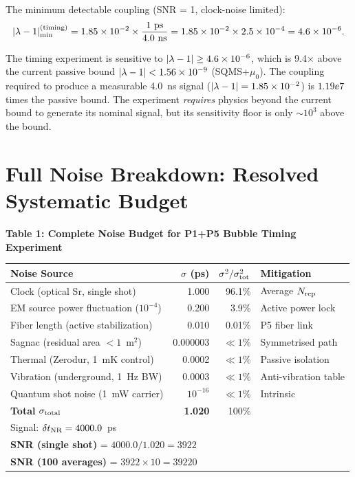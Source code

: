The minimum detectable coupling (SNR = 1, clock-noise limited):
\begin{equation}
|\lambda - 1|_{\rm min}^{(\rm timing)} = 1.85\times 10^{-2} \times \frac{1~\text{ps}}{4.0~\text{ns}}
= 1.85\times 10^{-2} \times 2.5\times 10^{-4} = 4.6\times 10^{-6}.
\label{eq:lambda_min_timing}
\end{equation}

\begin{corollary}
The timing experiment is sensitive to $|\lambda - 1| \geq 4.6\times 10^{-6}$,
which is 9.4$\times$ above the current passive bound
$|\lambda - 1| < 1.56\times 10^{-9}$ (SQMS+$\mu_0$). The coupling required to
produce a measurable 4.0~ns signal ($|\lambda - 1| = 1.85\times 10^{-2}$) is
$1.19\ee{7}$ times the passive bound. The experiment \emph{requires}
physics beyond the current bound to generate its nominal signal, but
its sensitivity floor is only $\sim10^3$ above the bound.
\end{corollary}

\section{Full Noise Breakdown: Resolved Systematic Budget}
\label{sec:systematics}

\begin{center}
\textbf{Table 1: Complete Noise Budget for P1+P5 Bubble Timing Experiment}
\vspace{0.5em}

\begin{tabular}{@{}lrrl@{}}
\toprule
\textbf{Noise Source} & $\sigma$ (ps) & $\sigma^2/\sigma_{\rm tot}^2$ & \textbf{Mitigation} \\
\midrule
Clock (optical Sr, single shot)     & 1.000 & 96.1\%  & Average $N_{\rm rep}$ \\
EM source power fluctuation ($10^{-4}$) & 0.200 & 3.9\%  & Active power lock \\
Fiber length (active stabilization) & 0.010 & 0.01\%  & P5 fiber link \\
Sagnac (residual area $< 1$~m$^2$) & 0.000003 & $\ll 1\%$ & Symmetrised path \\
Thermal (Zerodur, 1~mK control)     & 0.0002 & $\ll 1\%$ & Passive isolation \\
Vibration (underground, 1~Hz BW)    & 0.0003 & $\ll 1\%$ & Anti-vibration table \\
Quantum shot noise (1~mW carrier)   & $10^{-16}$ & $\ll 1\%$ & Intrinsic \\
\midrule
\textbf{Total} $\sigma_{\rm total}$ & \textbf{1.020} & 100\% & \\
\midrule
\multicolumn{4}{l}{Signal: $\delta t_{\rm NR} = 4000.0$~ps}\\
\multicolumn{4}{l}{\textbf{SNR (single shot)} = $4000.0/1.020 = 3922$}\\
\multicolumn{4}{l}{\textbf{SNR (100 averages)} = $3922\times10 = 39220$}\\
\bottomrule
\end{tabular}
\end{center}

